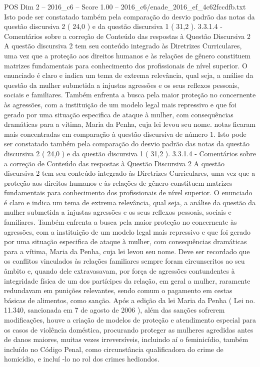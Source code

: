 \begin{textsample}{POS Dim 2 – 2016\_c6 – Score 1.00 – 2016\_c6/enade\_2016\_ef\_4c62fccdfb.txt}
Isto pode ser constatado também pela comparação do desvio padrão das notas da questão discursiva 2 ( 24,0 ) e da questão discursiva 1 ( 31,2 ). 3.3.1.4 - Comentários sobre a correção de Conteúdo das respostas à Questão Discursiva 2 A questão discursiva 2 tem seu conteúdo integrado às Diretrizes Curriculares, uma vez que a proteção aos direitos humanos e às relações de gênero constituem matrizes fundamentais para conhecimento dos profissionais de nível superior.
O enunciado é claro e indica um tema de extrema relevância, qual seja, a análise da questão da mulher submetida a injustas agressões e os seus reflexos pessoais, sociais e familiares.
Também enfrenta a busca pela maior proteção no concernente às agressões, com a instituição de um modelo legal mais repressivo e que foi gerado por uma situação especifica de ataque à mulher, com consequências dramáticas para a vítima, Maria da Penha, cuja lei levou seu nome. notas ficaram mais concentradas em comparação à questão discursiva de número 1.
Isto pode ser constatado também pela comparação do desvio padrão das notas da questão discursiva 2 ( 24,0 ) e da questão discursiva 1 ( 31,2 ). 3.3.1.4 - Comentários sobre a correção de Conteúdo das respostas à Questão Discursiva 2 A questão discursiva 2 tem seu conteúdo integrado às Diretrizes Curriculares, uma vez que a proteção aos direitos humanos e às relações de gênero constituem matrizes fundamentais para conhecimento dos profissionais de nível superior.
O enunciado é claro e indica um tema de extrema relevância, qual seja, a análise da questão da mulher submetida a injustas agressões e os seus reflexos pessoais, sociais e familiares.
Também enfrenta a busca pela maior proteção no concernente às agressões, com a instituição de um modelo legal mais repressivo e que foi gerado por uma situação especifica de ataque à mulher, com consequências dramáticas para a vítima, Maria da Penha, cuja lei levou seu nome.
Deve ser recordado que os conflitos vinculados às relações familiares sempre foram circunscritos ao seu âmbito e, quando dele extravasavam, por força de agressões contundentes à integridade física de um dos partícipes da relação, em geral a mulher, raramente redundavam em punições relevantes, sendo comum o pagamento em cestas básicas de alimentos, como sanção.
Após a edição da lei Maria da Penha ( Lei no. 11.340, sancionada em 7 de agosto de 2006 ), além das sanções sofrerem modificações, houve a criação de modelos de proteção e atendimento especial para os casos de violência doméstica, procurando proteger as mulheres agredidas antes de danos maiores, muitas vezes irreversíveis, incluindo aí o feminicídio, também incluído no Código Penal, como circunstância qualificadora do crime de homicídio, e incluí -lo no rol dos crimes hediondos.

\end{textsample}
